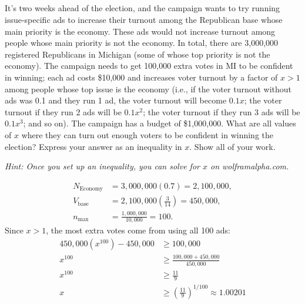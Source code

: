 \documentclass[newpages]{assignment}
\begin{document}
\subsection{}
\begin{problem}
    It's two weeks ahead of the election, and the campaign wants to try running issue-specific ads to increase their turnout among the Republican base whose main priority is the economy. These ads would not increase turnout among people whose main priority is not the economy. In total, there are 3,000,000 registered Republicans in Michigan (some of whose top priority is not the economy). The campaign needs to get 100,000 extra votes in MI to be confident in winning; each ad costs \$10,000 and increases voter turnout by a factor of $x>1$ among people whose top issue is the economy (i.e., if the voter turnout without ads was 0.1 and they run 1 ad, the voter turnout will become $0.1x$; the voter turnout if they run 2 ads will be $0.1x^2$; the voter turnout if they run 3 ads will be $0.1x^3$; and so on). The campaign has a budget of \$1,000,000. What are all values of $x$ where they can turn out enough voters to be confident in winning the election? Express your answer as an inequality in $x$. Show all of your work.

    \emph{Hint: Once you set up an inequality, you can solve for $x$ on wolframalpha.com.}
\end{problem}
\begin{solution}
    \[
        \begin{aligned}
            N_{\text{Economy}} & = 3{,}000{,}000(0.7)=2{,}100{,}000,                 \\
            V_{\text{base}}    & = 2{,}100{,}000\left(\frac{3}{14}\right)=450{,}000, \\
            n_{\max}           & = \frac{1{,}000{,}000}{10{,}000}=100.
        \end{aligned}
    \]
    Since $x>1$, the most extra votes come from using all 100 ads:
    \[
        \begin{aligned}
            450{,}000\left(x^{100}\right) - 450{,}000 & \geq 100{,}000                                                 \\
            x^{100}                                   & \geq \frac{100{,}000 + 450{,}000}{450{,}000}                   \\
            x^{100}                                   & \geq \frac{11}{9}                                              \\
            x                                         & \geq \left(\frac{11}{9}\right)^{1/100} \approx \boxed{1.00201}
        \end{aligned}
    \]
\end{solution}
\end{document}
